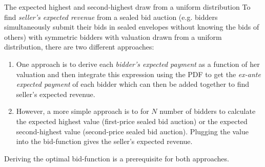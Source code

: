 \begin{frame}{The expected highest and second-highest draw from a uniform distribution}
    To find \textit{seller's expected revenue} from a sealed bid auction (e.g. bidders simultaneously submit their bids in sealed envelopes without knowing the bids of others) with symmetric bidders with valuation drawn from a uniform distribution, there are two different approaches:
    \begin{enumerate}
      \item One approach is to derive each \textit{bidder's expected payment} as a function of her valuation and then integrate this expression using the PDF to get the \textit{ex-ante expected payment} of each bidder which can then be added together to find seller's expected revenue.
      \item However, a more simple approach is to for $N$ number of bidders to calculate the expected highest value (first-price sealed bid auction) or the expected second-highest value (second-price sealed bid auction). Plugging the value into the bid-function gives the seller's expected revenue.
    \end{enumerate}
    Deriving the optimal bid-function is a prerequisite for both approaches.
\end{frame}

